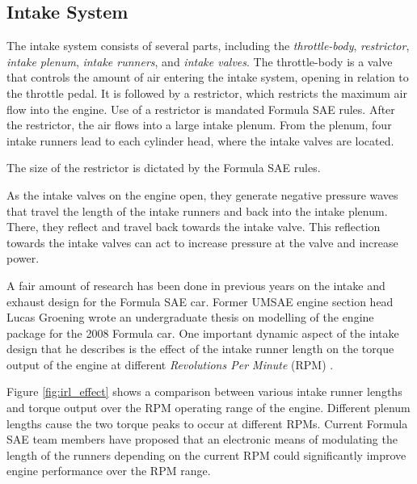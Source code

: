 \subsection{Intake System}

The intake system consists of several parts, including the \emph{throttle-body}, \emph{restrictor}, \emph{intake plenum}, \emph{intake runners}, and \emph{intake valves}. The throttle-body is a valve that controls the amount of air entering the intake system, opening in relation to the throttle pedal. It is followed by a restrictor, which restricts the maximum air flow into the engine. Use of a restrictor is mandated Formula SAE rules. After the restrictor, the air flows into a large intake plenum. From the plenum, four intake runners lead to each cylinder head, where the intake valves are located.

The size of the restrictor is dictated by the Formula SAE rules.

As the intake valves on the engine open, they generate negative pressure waves that travel the length of the intake runners and back into the intake plenum. There, they reflect and travel back towards the intake valve. This reflection towards the intake valves can act to increase pressure at the valve and increase power.


A fair amount of research has been done in previous years on the intake and exhaust design for the Formula SAE car. Former UMSAE engine section head Lucas Groening wrote an undergraduate thesis on modelling of the engine package for the 2008 Formula car. One important dynamic aspect of the intake design that he describes is the effect of the intake runner length on the torque output of the engine at different \emph{Revolutions Per Minute} (RPM) \cite{LucasIntake}. 

Figure \ref{fig:irl_effect} shows a comparison between various intake runner lengths and torque output over the RPM operating range of the engine. Different plenum lengths cause the two torque peaks to occur at different RPMs. Current Formula SAE team members have proposed that an electronic means of modulating the length of the runners depending on the current RPM could significantly improve engine performance over the RPM range.

